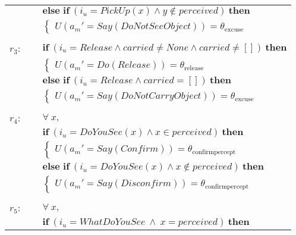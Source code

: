 \begin{footnotesize}
\begin{longtable}{p{2cm}l}
& $ \textbf{else if} \ (\mathit{i_u}\!=\!\mathit{PickUp({x})} \land \mathit{{y}}\!\notin\!\mathit{perceived}) \ \textbf{then}$ \\
& \;\;\;\;\; $ \begin{cases}U(\mathit{a_m}'\!=\!\mathit{Say(DoNotSeeObject)})\!=\!\theta_{\mathrm{excuse}} \end{cases}$ \\ \\[-1mm]
$r_{3}$: \ \ & $ \textbf{if} \ (\mathit{i_u}\!=\!\mathit{Release} \land \mathit{carried}\!\neq\!\mathit{None} \land \mathit{carried}\!\neq\!\mathit{[]}) \ \textbf{then} $ \\
 & \;\;\;\;\; $ \begin{cases}U(\mathit{a_m}'\!=\!\mathit{Do({Release})})\!=\!\theta_{\mathrm{release}} \end{cases}$ \vspace{1mm} \\ & $ \textbf{else if} \ (\mathit{i_u}\!=\!\mathit{Release} \land \mathit{carried}\!=\!\mathit{[]}) \ \textbf{then}$ \\
& \;\;\;\;\; $ \begin{cases}U(\mathit{a_m}'\!=\!\mathit{Say(DoNotCarryObject)})\!=\!\theta_{\mathrm{excuse}} \end{cases}$ \\ \\[-1mm]
$r_{4}$: \ \ & $\forall \ x, $ \\ & $ \textbf{if} \ (\mathit{i_u}\!=\!\mathit{DoYouSee({x})} \land \mathit{{x}}\!\in\!\mathit{perceived}) \ \textbf{then} $ \\
 & \;\;\;\;\; $ \begin{cases}U(\mathit{a_m}'\!=\!\mathit{Say(Confirm)})\!=\!\theta_{\mathrm{confirmpercept}} \end{cases}$ \vspace{1mm} \\ & $ \textbf{else if} \ (\mathit{i_u}\!=\!\mathit{DoYouSee({x})} \land \mathit{{x}}\!\notin\!\mathit{perceived}) \ \textbf{then}$ \\
& \;\;\;\;\; $ \begin{cases}U(\mathit{a_m}'\!=\!\mathit{Say(Disconfirm)})\!=\!\theta_{\mathrm{confirmpercept}} \end{cases}$ \\ \\[-1mm]
$r_{5}$: \ \ & $\forall \ x, $ \\
& $ \textbf{if} \ (\mathit{i_u}\!=\!\mathit{WhatDoYouSee} \ \land \ x\!=\!\mathit{perceived}) \ \textbf{then} $ \\

\end{longtable}
\end{footnotesize}

